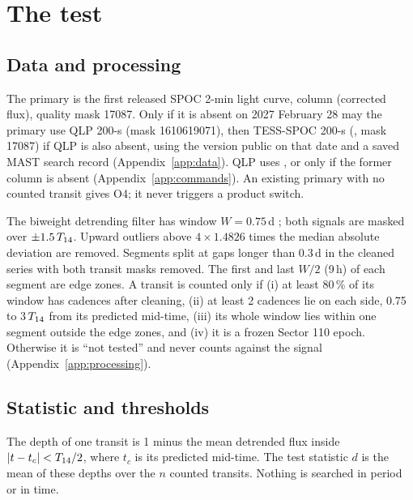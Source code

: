 \section{The test} \label{sec:test}

\subsection{Data and processing}

The primary is the first released SPOC 2-min light curve, column  (corrected flux), quality mask
17087. Only if it is absent on 2027 February 28 may the primary use QLP 200-s (mask 1610619071), then TESS-SPOC
200-s (, mask 17087) if QLP is also absent, using the version public on that date and a saved
MAST search record (Appendix~\ref{app:data}). QLP uses , or  only if the former
column is absent (Appendix~\ref{app:commands}). An existing primary with no counted transit gives O4; it never
triggers a product switch.

The biweight detrending filter has window $W=0.75$\,d \citep{Hippke2019}; both signals are masked over
$\pm1.5\,T_{14}$. Upward outliers above $4\times1.4826$ times the median absolute deviation are removed.
Segments split at gaps longer than 0.3\,d in the cleaned series with both transit masks removed. The first and last
$W/2$ (9\,h) of each segment are edge zones. A transit is counted only if (i) at least 80\,\% of its window has
cadences after cleaning, (ii) at least 2 cadences lie on each side, 0.75 to 3\,$T_{14}$ from its predicted
mid-time, (iii) its whole window lies within one segment outside the edge zones, and (iv) it is a frozen Sector 110
epoch. Otherwise it is ``not tested'' and never counts against the signal (Appendix~\ref{app:processing}).

\subsection{Statistic and thresholds} \label{sec:stat}

The depth of one transit is 1 minus the mean detrended flux inside $|t - t_c| < T_{14}/2$, where $t_c$ is its
predicted mid-time. The test statistic $d$ is the mean of these depths over the $n$ counted transits. Nothing is
searched in period or in time.

